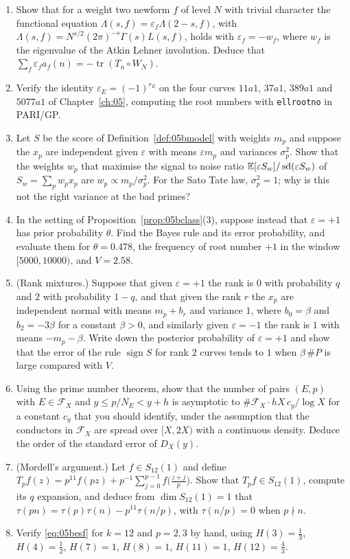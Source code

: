 \begin{enumerate}
\item Show that for a weight two newform $f$ of level $N$ with trivial character the functional equation $\Lambda(s,f)=\varepsilon_f\Lambda(2-s,f)$, with $\Lambda(s,f)=N^{s/2}(2\pi)^{-s}\Gamma(s)L(s,f)$, holds with $\varepsilon_f=-w_f$, where $w_f$ is the eigenvalue of the Atkin Lehner involution. Deduce that $\sum_f\varepsilon_fa_f(n)=-\operatorname{tr}(T_n\circ W_N)$.
\item Verify the identity $\varepsilon_E=(-1)^{r_E}$ on the four curves $11a1$, $37a1$, $389a1$ and $5077a1$ of Chapter~\ref{ch:05}, computing the root numbers with \texttt{ellrootno} in PARI/GP.
\item Let $S$ be the score of Definition~\ref{def:05bmodel} with weights $m_p$ and suppose the $x_p$ are independent given $\varepsilon$ with means $\varepsilon m_p$ and variances $\sigma_p^2$. Show that the weights $w_p$ that maximise the signal to noise ratio $\mathbb{E}[\varepsilon S_w]/\operatorname{sd}(\varepsilon S_w)$ of $S_w=\sum_pw_px_p$ are $w_p\propto m_p/\sigma_p^2$. For the Sato Tate law, $\sigma_p^2=1$; why is this not the right variance at the bad primes?
\item In the setting of Proposition~\ref{prop:05bclass}(3), suppose instead that $\varepsilon=+1$ has prior probability $\theta$. Find the Bayes rule and its error probability, and evaluate them for $\theta=0.478$, the frequency of root number $+1$ in the window $[5000,10000)$, and $V=2.58$.
\item (Rank mixtures.) Suppose that given $\varepsilon=+1$ the rank is $0$ with probability $q$ and $2$ with probability $1-q$, and that given the rank $r$ the $x_p$ are independent normal with means $m_p+b_r$ and variance $1$, where $b_0=\beta$ and $b_2=-3\beta$ for a constant $\beta>0$, and similarly given $\varepsilon=-1$ the rank is $1$ with means $-m_p-\beta$. Write down the posterior probability of $\varepsilon=+1$ and show that the error of the rule $\operatorname{sign}S$ for rank $2$ curves tends to $1$ when $\beta\,\#P$ is large compared with $V$.
\item Using the prime number theorem, show that the number of pairs $(E,p)$ with $E\in\mathcal{F}_X$ and $y\le p/N_E<y+h$ is asymptotic to $\#\mathcal{F}_X\cdot hX\,c_y/\log X$ for a constant $c_y$ that you should identify, under the assumption that the conductors in $\mathcal{F}_X$ are spread over $[X,2X)$ with a continuous density. Deduce the order of the standard error of $D_X(y)$.
\item (Mordell's argument.) Let $f\in S_{12}(1)$ and define $T_pf(z)=p^{11}f(pz)+p^{-1}\sum_{j=0}^{p-1}f\bigl(\frac{z+j}p\bigr)$. Show that $T_pf\in S_{12}(1)$, compute its $q$ expansion, and deduce from $\dim S_{12}(1)=1$ that $\tau(pn)=\tau(p)\tau(n)-p^{11}\tau(n/p)$, with $\tau(n/p)=0$ when $p\nmid n$.
\item Verify \eqref{eq:05besf} for $k=12$ and $p=2,3$ by hand, using $H(3)=\frac13$, $H(4)=\frac12$, $H(7)=1$, $H(8)=1$, $H(11)=1$, $H(12)=\frac43$.
\end{enumerate}

